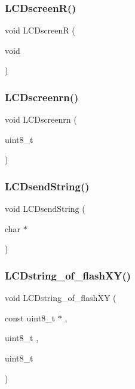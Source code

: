 \subsubsection{L\+C\+Dscreen\+R()}
{\footnotesize\ttfamily void L\+C\+DscreenR (\begin{DoxyParamCaption}\item[{void}]{ }\end{DoxyParamCaption})}

\mbox{\label{lcd_8h_aed79e576a314eccf11121c9a27653d0e}} 
\subsubsection{L\+C\+Dscreenrn()}
{\footnotesize\ttfamily void L\+C\+Dscreenrn (\begin{DoxyParamCaption}\item[{uint8\+\_\+t}]{ }\end{DoxyParamCaption})}

\mbox{\label{lcd_8h_aebd3aa2c5db18ac44c99161e8aa8f567}} 
\subsubsection{L\+C\+Dsend\+String()}
{\footnotesize\ttfamily void L\+C\+Dsend\+String (\begin{DoxyParamCaption}\item[{char $\ast$}]{ }\end{DoxyParamCaption})}

\mbox{\label{lcd_8h_a8d584bbd3fb4ae5b9273c367a380166a}} 
\subsubsection{L\+C\+Dstring\+\_\+of\+\_\+flash\+X\+Y()}
{\footnotesize\ttfamily void L\+C\+Dstring\+\_\+of\+\_\+flash\+XY (\begin{DoxyParamCaption}\item[{const uint8\+\_\+t $\ast$}]{,  }\item[{uint8\+\_\+t}]{,  }\item[{uint8\+\_\+t}]{ }\end{DoxyParamCaption})}

